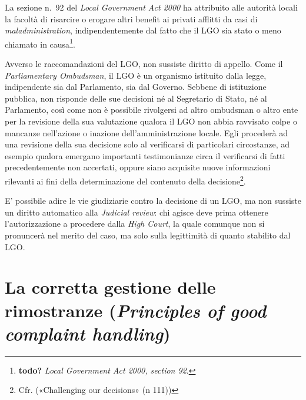 \documentclass[12pt,it,a4paper,]{report}
\begin{document}
La sezione n.~92 del \emph{Local Government Act 2000} ha attribuito alle
autorità locali la facoltà di risarcire o erogare altri benefit ai
privati afflitti da casi di \emph{maladministration}, indipendentemente
dal fatto che il LGO sia stato o meno chiamato in causa\footnote{\textbf{todo?}
  \emph{Local Government Act 2000, section 92}.}.

Avverso le raccomandazioni del LGO, non sussiste diritto di appello.
Come il \emph{Parliamentary Ombudsman}, il LGO è un organismo istituito
dalla legge, indipendente sia dal Parlamento, sia dal Governo. Sebbene
di istituzione pubblica, non risponde delle sue decisioni né al
Segretario di Stato, né al Parlamento, così come non è possibile
rivolgersi ad altro ombudsman o altro ente per la revisione della sua
valutazione qualora il LGO non abbia ravvisato colpe o mancanze
nell'azione o inazione dell'amministrazione locale. Egli procederà ad
una revisione della sua decisione solo al verificarsi di particolari
circostanze, ad esempio qualora emergano importanti testimonianze circa
il verificarsi di fatti precedentemente non accertati, oppure siano
acquisite nuove informazioni rilevanti ai fini della determinazione del
contenuto della decisione\footnote{Cfr. ({«Challenging our decisions»}
  (n 111))}.

E' possibile adire le vie giudiziarie contro la decisione di un LGO, ma
non sussiste un diritto automatico alla \emph{Judicial review}: chi
agisce deve prima ottenere l'autorizzazione a procedere dalla \emph{High
Court}, la quale comunque non si pronuncerà nel merito del caso, ma solo
sulla legittimità di quanto stabilito dal LGO.

\hypertarget{la-corretta-gestione-delle-rimostranze-principles-of-good-complaint-handling}{%
\section{\texorpdfstring{La corretta gestione delle rimostranze
(\emph{Principles of good complaint
handling})}{La corretta gestione delle rimostranze (Principles of good complaint handling)}}\label{la-corretta-gestione-delle-rimostranze-principles-of-good-complaint-handling}}
\end{document}
